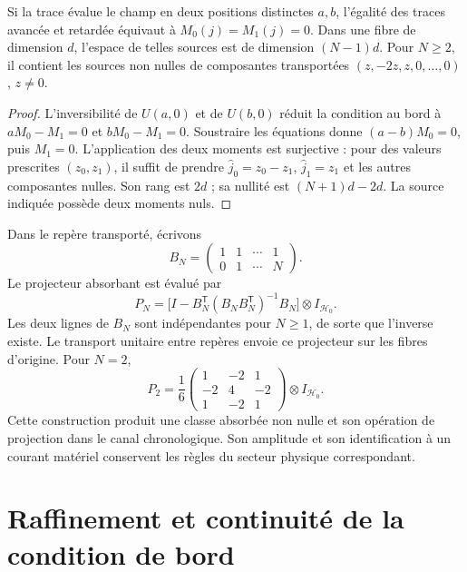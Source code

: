 \begin{proposition}
\label{x_reciprocidad:vii:prop:absorcion-momentos}
Si la trace évalue le champ en deux positions distinctes \(a,b\),
l'égalité des traces avancée et retardée équivaut à
\(M_0(j)=M_1(j)=0\). Dans une fibre de dimension \(d\), l'espace
de telles sources est de dimension \((N-1)d\). Pour \(N\geq2\),
il contient les sources non nulles de composantes transportées
\((z,-2z,z,0,\ldots,0)\), \(z\neq0\).
\end{proposition}
\begin{proof}
L'inversibilité de \(U(a,0)\) et de \(U(b,0)\) réduit la condition
au bord à \(aM_0-M_1=0\) et \(bM_0-M_1=0\).
Soustraire les équations donne \((a-b)M_0=0\), puis \(M_1=0\).
L'application des deux moments est surjective : pour des valeurs prescrites
\((z_0,z_1)\), il suffit de prendre
\(\widehat j_0=z_0-z_1\), \(\widehat j_1=z_1\) et les autres
composantes nulles. Son rang est \(2d\) ; sa nullité est
\((N+1)d-2d\). La source indiquée possède deux moments nuls.
\end{proof}

Dans le repère transporté, écrivons
\[
 B_N=\begin{pmatrix}1&1&\cdots&1\\0&1&\cdots&N\end{pmatrix}.
\]
Le projecteur absorbant est évalué par
\begin{equation}
 P_N=\bigl[I-B_N^{\mathsf T}(B_NB_N^{\mathsf T})^{-1}B_N\bigr]
       \otimes I_{\mathcal H_0}.
 \label{x_reciprocidad:vii:eq:proyector-momentos-cronologicos}
\end{equation}
Les deux lignes de \(B_N\) sont indépendantes pour \(N\geq1\), de sorte que l'inverse existe. Le transport unitaire entre repères envoie ce projecteur sur les fibres d'origine. Pour \(N=2\),
\[
 P_2=\frac16
 \begin{pmatrix}1&-2&1\\-2&4&-2\\1&-2&1\end{pmatrix}
 \otimes I_{\mathcal H_0}.
\]
Cette construction produit une classe absorbée non nulle et son opération de
projection dans le canal chronologique. Son amplitude et son identification à un
courant matériel conservent les règles du secteur physique correspondant.

\section{Raffinement et continuité de la condition de bord}
\label{x_reciprocidad:vii:subsec:refinamiento-absorcion}

